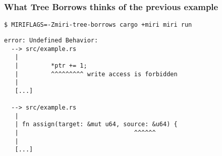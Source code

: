\begin{frame}[fragile]
    \frametitle{What Tree Borrows thinks of the previous example}
    \texttt{\$ MIRIFLAGS=-Zmiri-tree-borrows cargo +miri miri run}
        \begin{lstlisting}
error: Undefined Behavior:
  --> src/example.rs
   |
   |         *ptr += 1;
   |         ^^^^^^^^^ write access is forbidden
   |
   [...]

  --> src/example.rs
   |
   | fn assign(target: &mut u64, source: &u64) {
   |                                ^^^^^^
   |
   [...]
        \end{lstlisting}
\end{frame}
